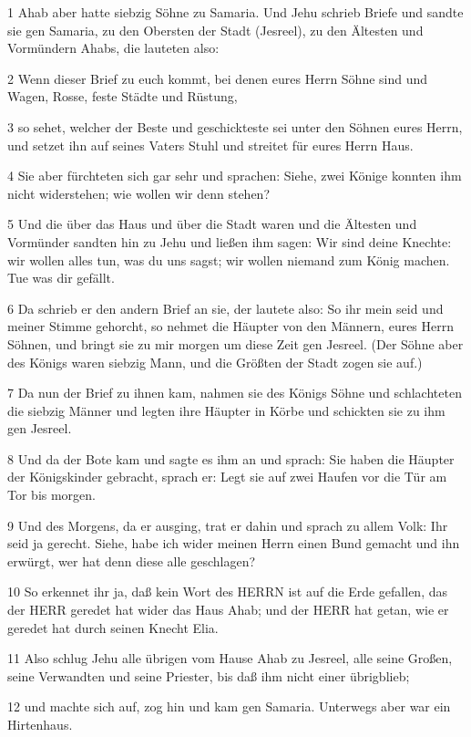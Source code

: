 \par 1 Ahab aber hatte siebzig Söhne zu Samaria. Und Jehu schrieb Briefe und sandte sie gen Samaria, zu den Obersten der Stadt (Jesreel), zu den Ältesten und Vormündern Ahabs, die lauteten also:
\par 2 Wenn dieser Brief zu euch kommt, bei denen eures Herrn Söhne sind und Wagen, Rosse, feste Städte und Rüstung,
\par 3 so sehet, welcher der Beste und geschickteste sei unter den Söhnen eures Herrn, und setzet ihn auf seines Vaters Stuhl und streitet für eures Herrn Haus.
\par 4 Sie aber fürchteten sich gar sehr und sprachen: Siehe, zwei Könige konnten ihm nicht widerstehen; wie wollen wir denn stehen?
\par 5 Und die über das Haus und über die Stadt waren und die Ältesten und Vormünder sandten hin zu Jehu und ließen ihm sagen: Wir sind deine Knechte: wir wollen alles tun, was du uns sagst; wir wollen niemand zum König machen. Tue was dir gefällt.
\par 6 Da schrieb er den andern Brief an sie, der lautete also: So ihr mein seid und meiner Stimme gehorcht, so nehmet die Häupter von den Männern, eures Herrn Söhnen, und bringt sie zu mir morgen um diese Zeit gen Jesreel. (Der Söhne aber des Königs waren siebzig Mann, und die Größten der Stadt zogen sie auf.)
\par 7 Da nun der Brief zu ihnen kam, nahmen sie des Königs Söhne und schlachteten die siebzig Männer und legten ihre Häupter in Körbe und schickten sie zu ihm gen Jesreel.
\par 8 Und da der Bote kam und sagte es ihm an und sprach: Sie haben die Häupter der Königskinder gebracht, sprach er: Legt sie auf zwei Haufen vor die Tür am Tor bis morgen.
\par 9 Und des Morgens, da er ausging, trat er dahin und sprach zu allem Volk: Ihr seid ja gerecht. Siehe, habe ich wider meinen Herrn einen Bund gemacht und ihn erwürgt, wer hat denn diese alle geschlagen?
\par 10 So erkennet ihr ja, daß kein Wort des HERRN ist auf die Erde gefallen, das der HERR geredet hat wider das Haus Ahab; und der HERR hat getan, wie er geredet hat durch seinen Knecht Elia.
\par 11 Also schlug Jehu alle übrigen vom Hause Ahab zu Jesreel, alle seine Großen, seine Verwandten und seine Priester, bis daß ihm nicht einer übrigblieb;
\par 12 und machte sich auf, zog hin und kam gen Samaria. Unterwegs aber war ein Hirtenhaus.
